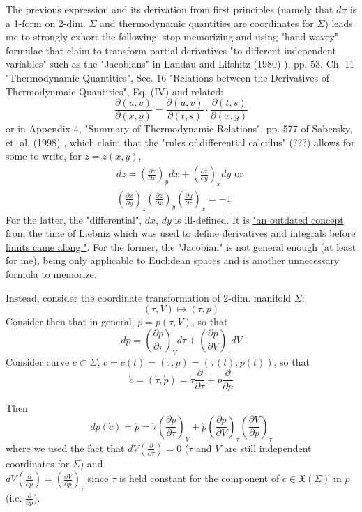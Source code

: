 \documentclass[twoside,landscape,10pt]{amsart}
\theoremstyle{plain}
\theoremstyle{definition}
\theoremstyle{remark}
\theoremstyle{remark}
\begin{document}
\begin{multicols*}{2}
The previous expression and its derivation from first principles (namely that $d\sigma$ is a 1-form on 2-dim. $\Sigma$ and thermodynamic quantities are coordinates for $\Sigma$) leads me to strongly exhort the following: stop memorizing and using "hand-wavey" formulae that claim to transform partial derivatives "to different independent variables" such as the "Jacobians" in Landau and Lifshitz (1980) \cite{LLandauELifshitz1980}), pp. 53, Ch. 11 "Thermodynamic Quantities", Sec. 16 "Relations between the Derivatives of Thermodynmaic Quantities", Eq. (IV) and related:
\[
\frac{ \partial (u,v)}{ \partial (x,y)} = \frac{ \partial (u,v) }{ \partial (t,s)} \cdot \frac{\partial (t,s) }{ \partial (x,y) }
\]
or in Appendix 4, "Summary of Thermodynamic Relations", pp. 577 of Sabersky, et. al. (1998) \cite{SAHG1998}, which claim that the "rules of differential calculus" (???) allows for some to write, for $z = z(x,y)$, 
\[
\begin{gathered} 
dz = \left( \frac{ \partial z}{ \partial x} \right)_y dx + \left( \frac{ \partial z}{ \partial y} \right)_x dy \text{ or } \\
\left( \frac{ \partial x }{ \partial y} \right)_z \left( \frac{ \partial z }{ \partial x} \right)_y \left( \frac{ \partial y}{ \partial z }\right)_x = -1
\end{gathered}
\]
For the latter, the "differential", $dx$, $dy$ is ill-defined. It is \href{https://math.stackexchange.com/questions/2101896/what-is-the-meaning-of-a-differential-in-terms-of-an-exact-differential}{"an outdated concept from the time of Liebniz which was used to define derivatives and integrals before limits came along."}. For the former, the "Jacobian" is not general enough (at least for me), being only applicable to Euclidean spaces and is another unnecessary formula to memorize.

Instead, consider the coordinate transformation of 2-dim. manifold $\Sigma$:
\[
(\tau, V) \mapsto (\tau, p)
\]
Consider then that in general, $p = p(\tau, V)$, so that 
\[
dp = \left( \frac{ \partial p }{ \partial \tau} \right)_V d\tau + \left( \frac{ \partial p }{ \partial V} \right)_{\tau} dV
\]
Consider curve $c\subset \Sigma$, $c=c(t) = (\tau, p) = (\tau(t), p(t))$, so that 
\[
\dot{c} = ( \dot{\tau}, \dot{p}) = \dot{\tau} \frac{ \partial }{ \partial \tau } + \dot{p} \frac{ \partial }{ \partial p}
\]

Then
\begin{equation}\label{Eq:CoordinateTransformationOfPressurep}
dp(\dot{c}) = \dot{p} = \dot{\tau} \left( \frac{ \partial p }{ \partial \tau} \right)_V + \dot{p} \left( \frac{\partial p}{ \partial V}\right)_{\tau}  \left( \frac{ \partial V}{ \partial p } \right)_{\tau}
\end{equation}
where we used the fact that $dV \left( \frac{ \partial }{ \partial \tau } \right) = 0 $ ($\tau$ and $V$ are still independent coordinates for $\Sigma$) and \\
$dV\left( \frac{ \partial }{ \partial p} \right) = \left( \frac{ \partial V}{ \partial p } \right)_{\tau}$ since $\tau$ is held constant for the component of $\dot{c} \in \mathfrak{X}(\Sigma)$ in $p$ (i.e. $\frac{\partial }{ \partial p}$).


\end{multicols*}
\end{document}
